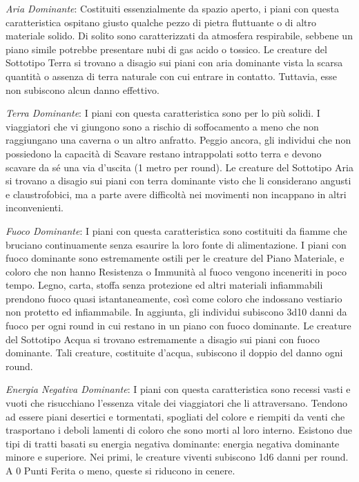 \documentclass[a4paper,twoside,openany]{book}
\begin{document}
\begin{multicols}{2}
\emph{Aria Dominante}: Costituiti essenzialmente da spazio aperto, i piani con questa caratteristica ospitano giusto qualche pezzo di pietra fluttuante o di altro materiale solido. Di solito sono caratterizzati da atmosfera respirabile, sebbene un piano simile potrebbe presentare nubi di gas acido o tossico. Le creature del Sottotipo Terra si trovano a disagio sui piani con aria dominante vista la scarsa quantità o assenza di terra naturale con cui entrare in contatto. Tuttavia, esse non subiscono alcun danno effettivo.

\emph{Terra Dominante}: I piani con questa caratteristica sono per lo più solidi. I viaggiatori che vi giungono sono a rischio di soffocamento a meno che non raggiungano una caverna o un altro anfratto. Peggio ancora, gli individui che non possiedono la capacità di Scavare restano intrappolati sotto terra e devono scavare da sé una via d'uscita (1 metro per round).
Le creature del Sottotipo Aria si trovano a disagio sui piani con terra dominante visto che li considerano angusti e claustrofobici, ma a parte avere difficoltà nei movimenti non incappano in altri inconvenienti.

\emph{Fuoco Dominante}: I piani con questa caratteristica sono costituiti da fiamme che bruciano continuamente senza esaurire la loro fonte di alimentazione. I piani con fuoco dominante sono estremamente ostili per le creature del Piano Materiale, e coloro che non hanno Resistenza o Immunità al fuoco vengono inceneriti in poco tempo. Legno, carta, stoffa senza protezione ed altri materiali infiammabili prendono fuoco quasi istantaneamente, così come coloro che indossano vestiario non protetto ed infiammabile. In aggiunta, gli individui subiscono 3d10 danni da fuoco per ogni round in cui restano in un piano con fuoco dominante. Le creature del Sottotipo Acqua si trovano estremamente a disagio sui piani con fuoco dominante. Tali creature, costituite d'acqua, subiscono il doppio del danno ogni round.

\emph{Energia Negativa Dominante}: I piani con questa caratteristica sono recessi vasti e vuoti che risucchiano l'essenza vitale dei viaggiatori che li attraversano. Tendono ad essere piani desertici e tormentati, spogliati del colore e riempiti da venti che trasportano i deboli lamenti di coloro che sono morti al loro interno. Esistono due tipi di tratti basati su energia negativa dominante: energia negativa dominante minore e superiore. Nei primi, le creature viventi subiscono 1d6 danni per round. A 0 Punti Ferita o meno, queste si riducono in cenere.


\end{multicols}
\end{document}
